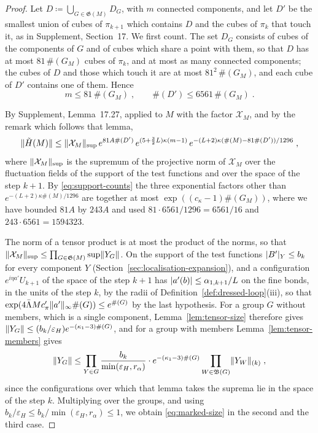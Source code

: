 \documentclass[11pt]{preprint}
\DeclarePairedDelimiter{\abs}{\lvert}{\rvert}
\DeclarePairedDelimiter{\norm}{\lVert}{\rVert}
\numberwithin{equation}{section}
\theoremstyle{definition}
\theoremstyle{remark}
\theoremstyle{plain}
\begin{document}
\begin{proof}
Let $D \coloneqq \bigcup_{G \in \mathfrak G(M)}D_G$, with $m$ connected components, and let $D'$ be the smallest union of cubes of $\pi_{k+1}$ which contains $D$ and the cubes of $\pi_k$ that touch it, as in Supplement, Section~17. We first count. The set $D_G$ consists of cubes of the components of $G$ and of cubes which share a point with them, so that $D$ has at most $81\,\#(G_M)$ cubes of $\pi_k$, and at most as many connected components; the cubes of $D$ and those which touch it are at most $81^2\,\#(G_M)$, and each cube of $D'$ contains one of them. Hence
\begin{equation}\label{eq:support-counts}
    m \leq 81\,\#(G_M)\;,
    \qquad
    \#(D') \leq 6561\,\#(G_M)\;.
\end{equation}

By Supplement, Lemma~17.27, applied to $M$ with the factor $\mathcal X_M$, and by the remark which follows that lemma,
\[
    \norm{\tilde H(M)} \leq \norm{\mathcal X_M}_{\sup}\,e^{81A\#(D')}\,e^{(5 + \frac32L)\kappa(m - 1)}\,e^{-(L + 2)\kappa(\#(M) - 81\#(D'))/1296}\;,
\]
where $\norm{\mathcal X_M}_{\sup}$ is the supremum of the projective norm of $\mathcal X_M$ over the fluctuation fields of the support of the test functions and over the space of the step $k + 1$. By \eqref{eq:support-counts} the three exponential factors other than $e^{-(L + 2)\kappa\#(M)/1296}$ are together at most $\exp((c_\kappa - 1)\#(G_M))$, where we have bounded $81A$ by $243A$ and used $81 \cdot 6561/1296 = 6561/16$ and $243 \cdot 6561 = 1594323$.

The norm of a tensor product is at most the product of the norms, so that $\norm{\mathcal X_M}_{\sup} \leq \prod_{G \in \mathfrak G(M)}\sup\norm{Y_G}$. On the support of the test functions $\abs{B'}_Y \leq b_k$ for every component $Y$ (Section~\ref{sec:localisation-expansion}), and a configuration $e^{i\eta a'}U_{k+1}$ of the space of the step $k + 1$ has $\abs{a'(b)} \leq \alpha_{1,k+1}/L$ on the fine bonds, in the units of the step $k$, by the radii of Definition~\ref{def:dressed-loop}(iii), so that $\exp(4\bar\Lambda Mc'_\pi\norm{a'}_\infty\#(G)) \leq e^{\#(G)}$ by the last hypothesis. For a group $G$ without members, which is a single component, Lemma~\ref{lem:tensor-size} therefore gives $\norm{Y_G} \leq (b_k/\varepsilon_H)e^{-(\kappa_1 - 3)\#(G)}$, and for a group with members Lemma~\ref{lem:tensor-members} gives
\[
    \norm{Y_G} \leq \prod_{Y \in G}\frac{b_k}{\min(\varepsilon_H, r_\alpha)}\cdot e^{-(\kappa_1 - 3)\#(G)}\prod_{W \in \mathfrak B(G)}\norm{Y_W}_{(k)}\;,
\]
since the configurations over which that lemma takes the suprema lie in the space of the step $k$. Multiplying over the groups, and using $b_k/\varepsilon_H \leq b_k/\min(\varepsilon_H, r_\alpha) \leq 1$, we obtain \eqref{eq:marked-size} in the second and the third case.


\end{proof}
\end{document}
